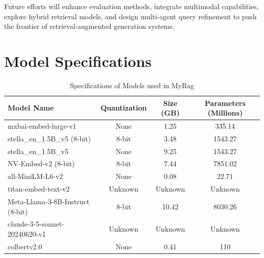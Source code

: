 \documentclass{scrartcl}
\begin{document}
Future efforts will enhance evaluation methods, integrate multimodal capabilities, explore hybrid retrieval models, and design multi-agent query refinement to push the frontier of retrieval-augmented generation systems.




\appendix
\section{Model Specifications}

\begin{table}[ht]
\centering
\begin{tabular}{|l|c|c|c|}
\hline
\textbf{Model Name} & \textbf{Quantization} & \textbf{Size (GB)} & \textbf{Parameters (Millions)} \\ \hline
mxbai-embed-large-v1 & None              & 1.25 & 335.14 \\ \hline
stella\_en\_1.5B\_v5 (8-bit) & 8-bit          & 3.48 & 1543.27 \\ \hline
stella\_en\_1.5B\_v5         & None           & 9.25 & 1543.27 \\ \hline
NV-Embed-v2 (8-bit)            & 8-bit          & 7.44 & 7851.02 \\ \hline
all-MiniLM-L6-v2 & None          & 0.08 & 22.71 \\ \hline
titan-embed-text-v2                   & Unknown        & Unknown & Unknown \\ \hline
Meta-Llama-3-8B-Instruct (8-bit) & 8-bit   & 10.42 & 8030.26 \\ \hline
claude-3-5-sonnet-20240620-v1      & Unknown           & Unknown & Unknown \\ \hline
colbertv2.0       & None                  & 0.41 & 110               \\ \hline
\end{tabular}
\caption{Specifications of Models used in MyRag}
\label{table:models_specification}
\end{table}

\end{document}
